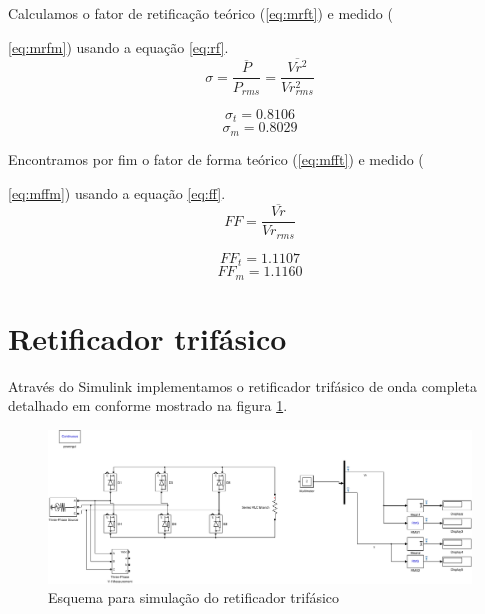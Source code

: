 \documentclass{report}
\begin{document}
Calculamos o fator de retificação teórico (\ref{eq:mrft}) e medido ({\ref{eq:mrfm}) usando a equação \ref{eq:rf}.
\begin{equation}
	\sigma = \frac{\overline{P}}{P_{rms}} = \frac{\overline{Vr^2}}{Vr_{rms}^2}
	\label{eq:rf}
\end{equation}

\begin{equation}
	\sigma_t = 0.8106
	\label{eq:mrft}
\end{equation}
\begin{equation}
	\sigma_m = 0.8029
	\label{eq:mrfm}
\end{equation}

Encontramos por fim o fator de forma teórico (\ref{eq:mfft}) e medido ({\ref{eq:mffm}) usando a equação \ref{eq:ff}.
\begin{equation}
FF = \frac{\overline{Vr}}{Vr_{rms}}
\label{eq:ff}
\end{equation}

\begin{equation}
FF_t = 1.1107
\label{eq:mfft}
\end{equation}
\begin{equation}
FF_m = 1.1160
\label{eq:mffm}
\end{equation}
\section{Retificador trifásico}
Através do Simulink implementamos o retificador trifásico de onda completa detalhado em \cite{bb:roteirosim1} conforme mostrado na figura \ref{fig:tsim}.
\begin{figure}[H]
	\centering
	\includegraphics[width=\linewidth]{matlab/tri_sim}
	\caption{Esquema para simulação do retificador trifásico}
	\label{fig:tsim}
\end{figure}

}}
\end{document}

